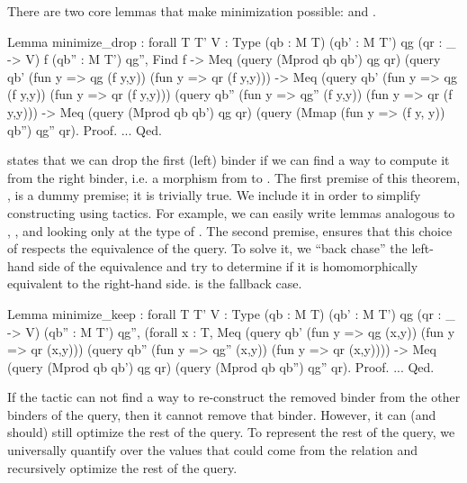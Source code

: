 \documentclass[preprint]{sigplanconf}
\begin{document}
There are two core lemmas that make minimization possible:  and .
\begin{coq}
Lemma minimize_drop
: forall {T T' V : Type} (qb : M T) (qb' : M T') qg (qr : _ -> V) f (qb'' : M T') qg'',
   Find f
-> Meq (query (Mprod qb qb') qg qr)
       (query qb' (fun y => qg (f y,y)) (fun y => qr (f y,y)))
-> Meq (query qb' (fun y => qg (f y,y)) (fun y => qr (f y,y)))
       (query qb'' (fun y => qg'' (f y,y)) (fun y => qr (f y,y)))
-> Meq (query (Mprod qb qb') qg qr)
       (query (Mmap (fun y => (f y, y)) qb'') qg'' qr).
Proof. ... Qed.
\end{coq}
 states that we can drop the first (left) binder if we can find a way to compute it from the right binder, i.e. a morphism from  to .
The first premise of this theorem, , is a dummy premise; it is trivially true.
We include it in order to simplify constructing  using tactics.
For example, we can easily write lemmas analogous to , , and  looking only at the type of .
The second premise, ensures that this choice of  respects the equivalence of the query.
To solve it, we ``back chase'' the left-hand side of the equivalence and try to determine if it is homomorphically equivalent to the right-hand side.
 is the fallback case.
\begin{coq}
Lemma minimize_keep
: forall {T T' V : Type} (qb : M T) (qb' : M T') qg (qr : _ -> V) (qb'' : M T') qg'',
  (forall x : T,
   Meq (query qb' (fun y => qg (x,y)) (fun y => qr (x,y)))
       (query qb'' (fun y => qg'' (x,y)) (fun y => qr (x,y)))) ->
  Meq (query (Mprod qb qb') qg qr)
      (query (Mprod qb qb'') qg'' qr).
Proof. ... Qed.
\end{coq}
If the tactic can not find a way to re-construct the removed binder from the other binders of the query, then it cannot remove that binder.
However, it can (and should) still optimize the rest of the query.
To represent the rest of the query, we universally quantify over the values that could come from the relation and recursively optimize the rest of the query.
\end{document}
